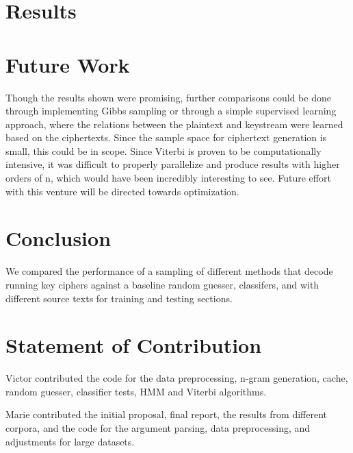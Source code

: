 \documentclass[11pt,letterpaper]{article}
\begin{document}
\section{Results}

\section{Future Work}
Though the results shown were promising, further comparisons could be done through implementing Gibbs sampling or through a simple supervised learning approach, where the relations between the plaintext and keystream were learned based on the ciphertexts. Since the sample space for ciphertext generation is small, this could be in scope. Since Viterbi is proven to be computationally intensive, it was difficult to properly parallelize and produce results with higher orders of n, which would have been incredibly interesting to see. Future effort with this venture will be directed towards optimization.

\section{Conclusion}
We compared the performance of a sampling of different methods that decode running key ciphers against a baseline random guesser, classifers, and with different source texts for training and testing sections. 

\section{Statement of Contribution}
Victor contributed the code for the data preprocessing, n-gram generation, cache, random guesser, classifier tests, HMM and Viterbi algorithms.

Marie contributed the initial proposal, final report, the results from different corpora, and the code for the argument parsing, data preprocessing, and adjustments for large datasets.



\end{document}
